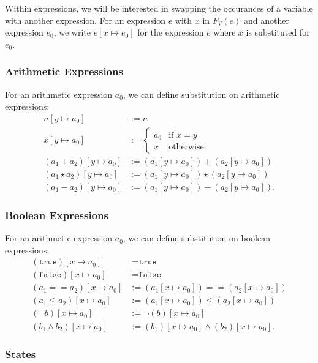 \documentclass[a4paper, 12pt, twoside]{article}
\begin{document}
Within expressions, we will be interested in swapping the occurances
of a variable with another expression. For an expression $e$ with
$x$ in $F_V(e)$ and another expression $e_0$, we write
$e[x\mapsto e_0]$ for the expression $e$ where $x$ is substituted
for $e_0$.

\subsubsection{Arithmetic Expressions}

For an arithmetic expression $a_0$, we can define substitution on
arithmetic expressions: \begin{align*}
  n[y \mapsto a_0] &:= n \\
  x[y \mapsto a_0] &:= \begin{cases}
    a_0 & \text{if } x = y \\
    x & \text{otherwise}
  \end{cases} \\
  (a_1 + a_2)[y \mapsto a_0] &:= (a_1[y \mapsto a_0]) + (a_2[y \mapsto a_0]) \\
  (a_1 \star a_2)[y \mapsto a_0] &:= (a_1[y \mapsto a_0]) \star (a_2[y \mapsto a_0]) \\
  (a_1 - a_2)[y \mapsto a_0] &:= (a_1[y \mapsto a_0]) - (a_2[y \mapsto a_0]).
\end{align*}

\subsubsection{Boolean Expressions}

For an arithmetic expression $a_0$, we can define substitution on 
boolean expressions: \begin{align*}
  (\texttt{true})[x \mapsto a_0] &:= \texttt{true} \\
  (\texttt{false})[x \mapsto a_0] &:=  \texttt{false} \\
  (a_1 == a_2)[x \mapsto a_0] &:= (a_1[x \mapsto a_0]) == (a_2[x \mapsto a_0])\\
  (a_1 \leq a_2)[x \mapsto a_0] &:= (a_1[x \mapsto a_0]) \leq (a_2[x \mapsto a_0]) \\
  (\neg b)[x \mapsto a_0] &:= \neg (b)[x \mapsto a_0] \\
  (b_1 \land b_2)[x \mapsto a_0] &:= (b_1)[x \mapsto a_0] \land (b_2)[x \mapsto a_0].
\end{align*}

\subsubsection{States}
\end{document}
